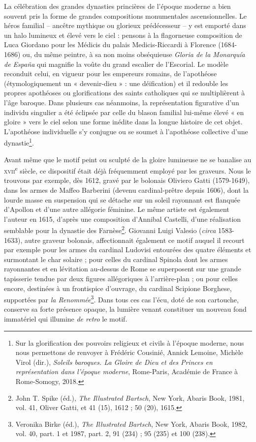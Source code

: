 \documentclass[12pt,twoside,openany]{book}
\begin{document}
La célébration des grandes dynasties princières de l’époque moderne a bien souvent pris la forme de grandes compositions monumentales ascensionnelles. Le héros familial – ancêtre mythique ou glorieux prédécesseur – y est emporté dans un halo lumineux et élevé vers le ciel : pensons à la flagorneuse composition de Luca Giordano pour les Médicis du palais Medicis-Riccardi à Florence (1684-1686) ou, du même peintre, à sa non moins obséquieuse \textit{Gloria de la Monarquía de España} qui magnifie la voûte du grand escalier de l’Escorial. Le modèle reconduit celui, en vigueur pour les empereurs romains, de l’apothéose (étymologiquement un « devenir-dieu » : une déification) et il redouble les propres apothéoses ou glorifications des saints catholiques qui se multiplièrent à l’âge baroque. Dans plusieurs cas néanmoins, la représentation figurative d’un individu singulier a été éclipsée par celle du blason familial lui-même élevé « en gloire » vers le ciel selon une forme inédite dans la longue histoire de cet objet. L’apothéose individuelle s’y conjugue ou se soumet à l’apothéose collective d’une dynastie\footnote{Sur la glorification des pouvoirs religieux et civils à l’époque moderne, nous nous permettons de renvoyer à Frédéric Cousinié, Annick Lemoine, Michèle Virol (dir.), \textit{Soleils baroques. La Gloire de Dieu et des Princes en représentation dans l’époque moderne}, Rome-Paris, Académie de France à Rome-Somogy, 2018.}.

Avant même que le motif peint ou sculpté de la gloire lumineuse ne se banalise au \textsc{xvii}\textsuperscript{e} siècle, ce dispositif était déjà fréquemment employé par les graveurs. Nous le trouvons par exemple, dès 1612, gravé par le bolonais Oliviero Gatti (1579-1649), dans les armes de Maffeo Barberini (devenu cardinal-prêtre depuis 1606), dont la lourde masse en suspension qui se détache sur un soleil rayonnant est flanquée d’Apollon et d’une autre allégorie féminine. Le même artiste est également l’auteur en 1615, d’après une composition d’Annibal Castelli, d’une réalisation semblable pour la dynastie des Farnèse\footnote{John T. Spike (éd.), \textit{The Illustrated Bartsch}, New York, Abaris Book, 1981, vol. 41, Oliver Gatti, et 41 (15), 1612 ; 50 (20), 1615.}. Giovanni Luigi Valesio (\textit{circa} 1583-1633), autre graveur bolonais, affectionnait également ce motif auquel il recourt par exemple pour les armes du cardinal Ludovisi entourées des quatre éléments et surmontant le char solaire ; pour celles du cardinal Spinola dont les armes rayonnantes et en lévitation au-dessus de Rome se superposent sur une grande tapisserie tendue par deux figures allégoriques à l’arrière-plan ; ou pour celles encore, destinées à un frontispice d’ouvrage, du cardinal Scipione Borghese, supportées par \textit{la Renommée}\footnote{Veronika Birke (éd.), \textit{The Illustrated Bartsch}, New York, Abaris Book, 1982, vol. 40, part. 1 et 1987, part. 2, 91 (234) ; 95 (235) et 100 (238).}. Dans tous ces cas l’écu, doté de son cartouche, conserve sa forte présence opaque, la lumière venant constituer un nouveau fond immatériel qui illumine \textit{de retro} le motif.
\end{document}
